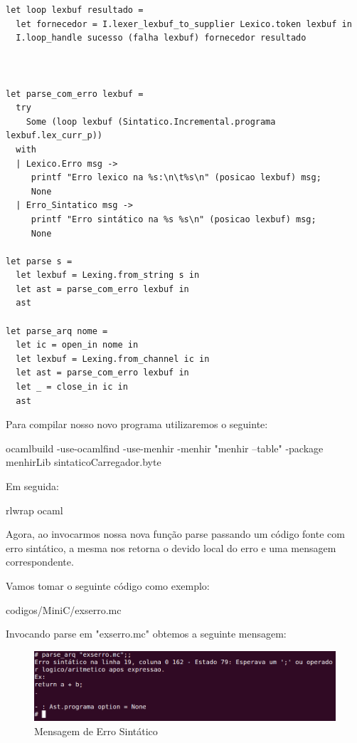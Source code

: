 \documentclass[12pt,a4paper,twoside]{report}
\begin{document}
\begin{enumerate}
\begin{verbatim}
let loop lexbuf resultado =
  let fornecedor = I.lexer_lexbuf_to_supplier Lexico.token lexbuf in
  I.loop_handle sucesso (falha lexbuf) fornecedor resultado



let parse_com_erro lexbuf =
  try
    Some (loop lexbuf (Sintatico.Incremental.programa lexbuf.lex_curr_p))
  with
  | Lexico.Erro msg ->
     printf "Erro lexico na %s:\n\t%s\n" (posicao lexbuf) msg;
     None
  | Erro_Sintatico msg ->
     printf "Erro sintático na %s %s\n" (posicao lexbuf) msg;
     None

let parse s =
  let lexbuf = Lexing.from_string s in
  let ast = parse_com_erro lexbuf in
  ast

let parse_arq nome =
  let ic = open_in nome in
  let lexbuf = Lexing.from_channel ic in
  let ast = parse_com_erro lexbuf in
  let _ = close_in ic in
  ast
\end{verbatim}
\end{enumerate}

Para compilar nosso novo programa utilizaremos o seguinte:

\begin{terminal}
ocamlbuild -use-ocamlfind -use-menhir -menhir "menhir --table" -package menhirLib sintaticoCarregador.byte
\end{terminal}

Em seguida:

\begin{terminal}
rlwrap ocaml
\end{terminal}

Agora, ao invocarmos nossa nova função parse passando um código fonte com erro sintático, a mesma nos retorna o devido local do erro e uma mensagem correspondente.

Vamos tomar o seguinte código como exemplo:

 {codigos/MiniC/exserro.mc}

Invocando parse em "exserro.mc" obtemos a seguinte mensagem:

\begin{figure}[!h]
\centering
\caption{Mensagem de Erro Sintático} \label{fig:sintatico}
\includegraphics[scale=0.5]{imagens/exserro.png}
\end{figure}
\end{document}
